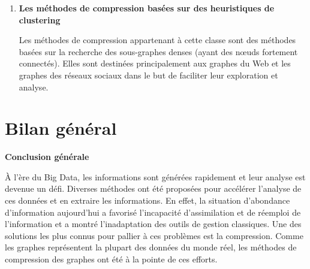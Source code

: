 \documentclass[a4paper,oneside,12pt]{report}
\theoremstyle{definition}
\newtheorem{defn}{Definition}[section]
\begin{document}
\begin{enumerate}[label=\alph*.]
\begin{enumerate}[label*=\arabic*.]
								
								
								
							
								
							\item \textbf{Les méthodes de compression basées sur des heuristiques de clustering} 				
							
							Les méthodes de compression appartenant à cette classe sont des méthodes basées sur la recherche des sous-graphes denses (ayant des nœuds fortement connectés). Elles sont destinées principalement aux graphes du Web et les graphes des réseaux sociaux dans le but de faciliter leur exploration et analyse.
								
								
										
						
						\end{enumerate}	
					
					\end{enumerate}
						
												
								
		\section{Bilan général}
	


	
	
	
	



\newpage

	\par
		\vskip 1in
		\Huge 
			\textbf{Conclusion générale} \\[0.5in]
		
		\normalsize
		
		À l'ère du Big Data, les informations sont générées rapidement et leur analyse est devenue un défi. Diverses méthodes ont été proposées pour accélérer l'analyse de ces données et en extraire les informations. En effet, la situation d'abondance d'information aujourd'hui a favorisé l'incapacité d'assimilation et de réemploi de l'information et a montré l'inadaptation des outils de gestion classiques. Une des solutions les plus connus pour pallier à ces problèmes est la compression. Comme les graphes représentent la plupart des données du monde réel, les méthodes de compression des graphes ont été à la pointe de ces efforts.\\
		
\end{document}
